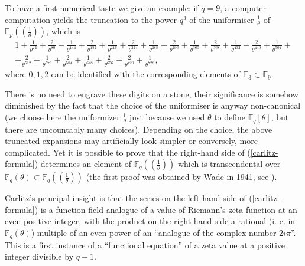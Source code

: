 \documentclass[11pt]{amsart}
\numberwithin{equation}{section}
\newcommand{\FF}{\mathbb{F}}
\begin{document}
To have a first numerical taste we give an example: if $q=9$, a computer computation yields the truncation to the power $q^3$ of the uniformiser $\frac{1}{\theta}$ of $\FF_p((\frac{1}{\theta}))$, which is
\begin{multline*}
1+\frac{1}{\theta^{72}}+\frac{2}{\theta^{80}}+\frac{1}{\theta^{144}
   }+\frac{2}{\theta^{152}}+\frac{1}{\theta^{216}}+\frac{
   2}{\theta^{224}}+\frac{1}{\theta^{288}}+\frac{2}{\theta^{296}}+\frac{1}{\theta^{360}}+\frac{2}{\theta^{368}}+\frac{1}{\theta^{432}}+\frac{2}{\theta^{440}}+\frac{1}{\theta^{504}}+\\+\frac{2}{\theta^{512}}+\frac{1}{\theta^{576}}+\frac{2}{\theta^{584}}
   +\frac{1}{\theta^{648}}+\frac{2}{\theta^{656}}+\frac{2}{\theta^{720}}+\frac{1}{\theta^{728}},\end{multline*}
   where $0,1,2$ can be identified with the corresponding elements of $\FF_3\subset\FF_9$.   

There is no need to engrave these digits on a stone, their significance is somehow diminished by the fact that the choice of the uniformiser is anyway non-canonical (we choose here the uniformizer $\frac{1}{\theta}$ just because we used $\theta$ to define $\FF_q[\theta]$, but there are uncountably many choices). Depending on the choice, the above truncated expansions may artificially look simpler or conversely, more complicated. Yet it is possible to prove that
the right-hand side of (\ref{carlitz-formula}) determines an element of $\FF_q((\frac{1}{\theta}))$ which is transcendental over 
   $\FF_q(\theta)\subset\FF_q((\frac{1}{\theta}))$ (the first proof was obtained by Wade in 1941, see \cite{WAD}).

Carlitz's principal insight is that the series on the left-hand side of (\ref{carlitz-formula}) is a function field analogue of a value of Riemann's zeta function at an even positive integer, with the product on the right-hand side a rational (i. e. in $\FF_q(\theta)$) multiple of an even power of an ``analogue of the complex number $2i\pi$''. This is a first instance of a ``functional equation'' of a zeta value at a positive integer divisible by $q-1$.
\end{document}
